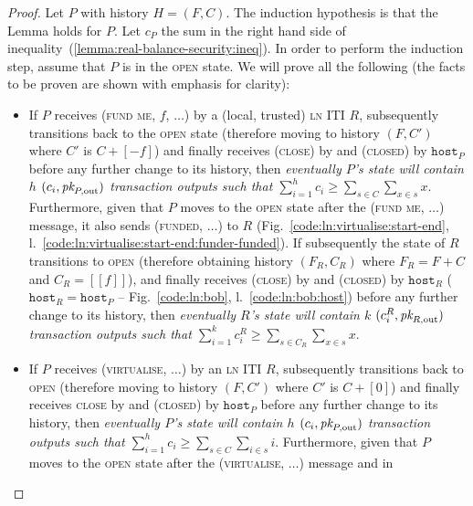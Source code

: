 \begin{proof}
  Let $P$ with history $H = (F, C)$. The induction hypothesis is that the Lemma
  holds for $P$. Let $c_P$ the sum in the right hand side of
  inequality~(\ref{lemma:real-balance-security:ineq}). In order to perform the
  induction step, assume that $P$ is in the \textsc{open} state. We will prove
  all the following (the facts to be proven are shown with emphasis for
  clarity):
  \begin{itemize}
    \item If $P$ receives (\textsc{fund me}, $f$, $\dots$) by a (local, trusted)
    \textsc{ln} ITI $R$, subsequently transitions back to the \textsc{open}
    state (therefore moving to history $(F, C')$ where $C'$ is $C + [-f]$) and
    finally receives (\textsc{close}) by \environment and (\textsc{closed}) by
    $\texttt{host}_P$ before any further change to its history, then
    \emph{eventually $P$'s \ledger state will contain $h$ $(c_i, \textit{pk}_{P,
    \mathrm{out}})$ transaction outputs such that $\sum\limits_{i=1}^h c_i \geq
    \sum\limits_{s \in C} \sum\limits_{x \in s} x$}. Furthermore, given that $P$
    moves to the \textsc{open} state after the (\textsc{fund me}, $\dots$)
    message, it also sends (\textsc{funded}, $\dots$) to $R$
    (Fig.~\ref{code:ln:virtualise:start-end},
    l.~\ref{code:ln:virtualise:start-end:funder-funded}). If subsequently the
    state of $R$ transitions to \textsc{open} (therefore obtaining history
    $(F_R, C_R)$ where $F_R = F + C$ and $C_R = [[f]]$), and finally receives
    (\textsc{close}) by \environment and (\textsc{closed}) by $\texttt{host}_R$
    ($\texttt{host}_R = \texttt{host}_P$ -- Fig.~\ref{code:ln:bob},
    l.~\ref{code:ln:bob:host}) before any further change to its history, then
    \emph{eventually $R$'s \ledger state will contain $k$ $(c^R_i, \textit{pk}_{R,
    \mathrm{out}})$ transaction outputs such that $\sum\limits_{i=1}^k c^R_i
    \geq \sum\limits_{s \in C_R} \sum\limits_{x \in s} x$}.
    \item If $P$ receives (\textsc{virtualise}, $\dots$) by an \textsc{ln} ITI
    $R$, subsequently transitions back to \textsc{open} (therefore moving to
    history $(F, C')$ where $C'$ is $C + [0]$) and finally receives
    \textsc{close} by \environment and (\textsc{closed}) by $\texttt{host}_P$
    before any further change to its history, then \emph{eventually $P$'s
    \ledger state will contain $h$ $(c_i, \textit{pk}_{P, \mathrm{out}})$ transaction
    outputs such that $\sum\limits_{i=1}^h c_i \geq \sum\limits_{s \in C}
    \sum\limits_{i \in s} i$}. Furthermore, given that $P$ moves to the
    \textsc{open} state after the (\textsc{virtualise}, $\dots$) message and in

\end{itemize}
\end{proof}
